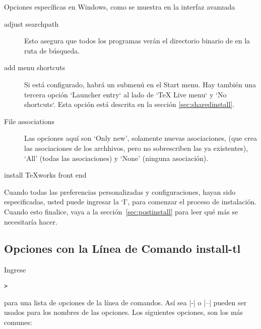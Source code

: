 \documentclass{article}
\begin{document}
Opciones específicas en Windows, como se muestra en la interfaz avanzada \GUI{}

\begin{description}
\item[adjust searchpath] Esto asegura que todos los programas verán el directorio binario de \TL{} en la ruta de búsqueda. 

\item[add menu shortcuts] Si está configurado, habrá un submenú \TL{} en el Start menu. Hay también una tercera opción `Launcher entry` al lado de `TeX Live menu` y `No shortcuts`. Esta opción está descrita en la sección 
\ref{sec:sharedinstall}.

\item[File associations] Las opciones aquí son `Only new', solamente nuevas asociaciones, (que crea las asociaciones de los archhivos, pero no sobrescriben las ya existentes), `All' (todas las asociaciones) y `None' (ninguna asociación).

\item[install \TeX{}works front end]
\end{description}

Cuando todas las preferencias personalizadas y configuraciones, hayan
sido especificadas, usted puede ingresar la `I', para comenzar el
proceso de instalación.  Cuando esto finalice, vaya a la
sección~\ref{sec:postinstall} para leer qué más se necesitaría hacer. 

\subsection{Opciones con la Línea de Comando install-tl}
\label{sec:cmdline}

Ingrese 
\begin{alltt}
	> 
\end{alltt}
para una lista de opciones de la línea de comandos. Así sea |-| o |--|
pueden ser usados para los nombres de las opciones. Los
siguientes opciones, son los más comunes:
\end{document}
